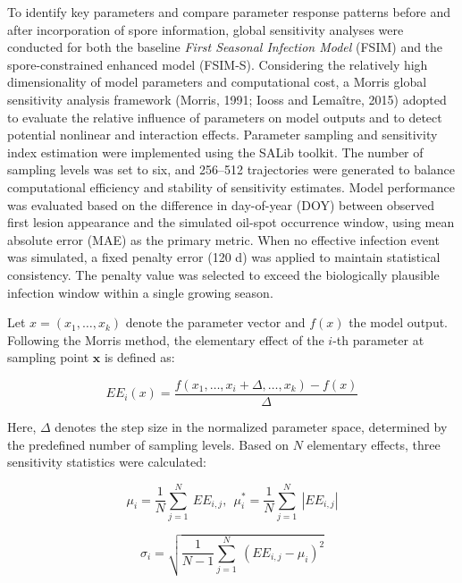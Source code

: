 \documentclass[
]{article}
\begin{document}
To identify key parameters and compare parameter response patterns
before and after incorporation of spore information, global sensitivity
analyses were conducted for both the baseline \emph{First Seasonal
Infection Model} (FSIM) and the spore-constrained enhanced model
(FSIM-S). Considering the relatively high dimensionality of model
parameters and computational cost, a Morris global sensitivity analysis
framework (Morris, 1991; Iooss and Lemaître, 2015) adopted to evaluate
the relative influence of parameters on model outputs and to detect
potential nonlinear and interaction effects. Parameter sampling and
sensitivity index estimation were implemented using the SALib toolkit.
The number of sampling levels was set to six, and 256--512 trajectories
were generated to balance computational efficiency and stability of
sensitivity estimates. Model performance was evaluated based on the
difference in day-of-year (DOY) between observed first lesion appearance
and the simulated oil-spot occurrence window, using mean absolute error
(MAE) as the primary metric. When no effective infection event was
simulated, a fixed penalty error (120 d) was applied to maintain
statistical consistency. The penalty value was selected to exceed the
biologically plausible infection window within a single growing season.

Let \(x = (x_{1},\ldots,x_{k})\) denote the parameter vector and
\(f(x)\) the model output. Following the Morris method, the elementary
effect of the \(i\)-th parameter at sampling point \(\mathbf{x}\) is
defined as:

\begin{equation}
EE_{i}(x) = \frac{f(x_{1},\ldots,x_{i} + \Delta,\ldots,x_{k}) - f(x)}{\Delta}
\tag{9}
\end{equation}

Here, \(\Delta\) denotes the step size in the normalized parameter
space, determined by the predefined number of sampling levels. Based on
\(N\) elementary effects, three sensitivity statistics were calculated:

\begin{equation}
\mu_{i} = \frac{1}{N}\sum_{j = 1}^{N}\mspace{2mu}\mspace{2mu} EE_{i,j},\ {\ \mu}_{i}^{*} = \frac{1}{N}\sum_{j = 1}^{N}\mspace{2mu}\mspace{2mu}|EE_{i,j}|
\tag{10}
\end{equation}

\begin{equation}
\sigma_{i} = \sqrt{\frac{1}{N - 1}\sum_{j = 1}^{N}\mspace{2mu}\mspace{2mu}{(EE_{i,j} - \mu_{i})}^{2}}
\tag{11}
\end{equation}
\end{document}

